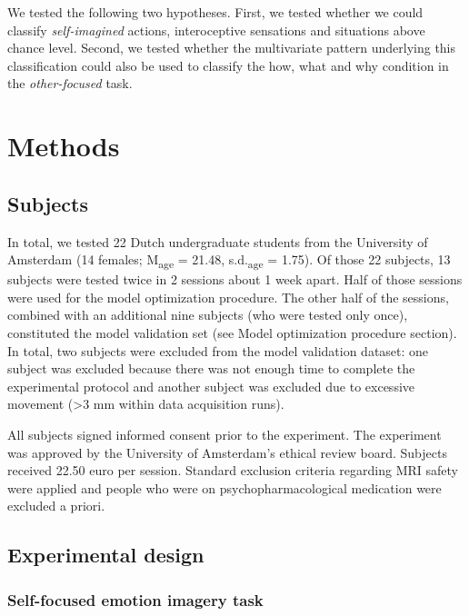 \documentclass[11pt,american,a4paper,oneside,]{memoir} %
\begin{document}
We tested the following two hypotheses. First, we tested whether we could classify \emph{self-imagined} actions, interoceptive sensations and situations above chance level. Second, we tested whether the multivariate pattern underlying this classification could also be used to classify the how, what and why condition in the \emph{other-focused} task.

\hypertarget{shared-states-methods}{%
\section{Methods}\label{shared-states-methods}}

\hypertarget{shared-states-methods-subjects}{%
\subsection{Subjects}\label{shared-states-methods-subjects}}

In total, we tested 22 Dutch undergraduate students from the University of Amsterdam (14 females; M\textsubscript{age} = 21.48, s.d.\textsubscript{age} = 1.75). Of those 22 subjects, 13 subjects were tested twice in 2 sessions about 1 week apart. Half of those sessions were used for the model optimization procedure. The other half of the sessions, combined with an additional nine subjects (who were tested only once), constituted the model validation set (see Model optimization procedure section). In total, two subjects were excluded from the model validation dataset: one subject was excluded because there was not enough time to complete the experimental protocol and another subject was excluded due to excessive movement (\textgreater3 mm within data acquisition runs).

All subjects signed informed consent prior to the experiment. The experiment was approved by the University of Amsterdam's ethical review board. Subjects received 22.50 euro per session. Standard exclusion criteria regarding MRI safety were applied and people who were on psychopharmacological medication were excluded a priori.

\hypertarget{shared-states-methods-experimental-design}{%
\subsection{Experimental design}\label{shared-states-methods-experimental-design}}

\hypertarget{shared-states-methods-experimental-design-sf-task}{%
\subsubsection{Self-focused emotion imagery task}\label{shared-states-methods-experimental-design-sf-task}}
\end{document}
